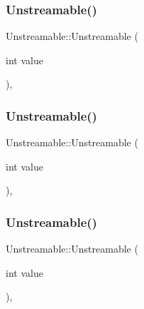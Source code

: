 \subsubsection{\texorpdfstring{Unstreamable()}{Unstreamable()}\hspace{0.1cm}{\footnotesize\ttfamily [1/3]}}
{\footnotesize\ttfamily Unstreamable\+::\+Unstreamable (\begin{DoxyParamCaption}\item[{int}]{value }\end{DoxyParamCaption})\hspace{0.3cm}{\ttfamily [inline]}, {\ttfamily [explicit]}}

\mbox{\label{class_unstreamable_aec8af0d0f78468a9094f1b36332a0842}} 
\subsubsection{\texorpdfstring{Unstreamable()}{Unstreamable()}\hspace{0.1cm}{\footnotesize\ttfamily [2/3]}}
{\footnotesize\ttfamily Unstreamable\+::\+Unstreamable (\begin{DoxyParamCaption}\item[{int}]{value }\end{DoxyParamCaption})\hspace{0.3cm}{\ttfamily [inline]}, {\ttfamily [explicit]}}

\mbox{\label{class_unstreamable_aec8af0d0f78468a9094f1b36332a0842}} 
\subsubsection{\texorpdfstring{Unstreamable()}{Unstreamable()}\hspace{0.1cm}{\footnotesize\ttfamily [3/3]}}
{\footnotesize\ttfamily Unstreamable\+::\+Unstreamable (\begin{DoxyParamCaption}\item[{int}]{value }\end{DoxyParamCaption})\hspace{0.3cm}{\ttfamily [inline]}, {\ttfamily [explicit]}}



